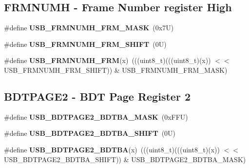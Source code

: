 \subsection*{F\+R\+M\+N\+U\+MH -\/ Frame Number register High}
\begin{DoxyCompactItemize}
\item 
\mbox{\label{group___u_s_b___register___masks_ga436241a677d27ecae3001b228b51f536}} 
\#define {\bfseries U\+S\+B\+\_\+\+F\+R\+M\+N\+U\+M\+H\+\_\+\+F\+R\+M\+\_\+\+M\+A\+SK}~(0x7\+U)
\item 
\mbox{\label{group___u_s_b___register___masks_gacb18c63687d37e245a79d7e7551823a3}} 
\#define {\bfseries U\+S\+B\+\_\+\+F\+R\+M\+N\+U\+M\+H\+\_\+\+F\+R\+M\+\_\+\+S\+H\+I\+FT}~(0\+U)
\item 
\mbox{\label{group___u_s_b___register___masks_gafe9face0ec6a617199ad76945c034da8}} 
\#define {\bfseries U\+S\+B\+\_\+\+F\+R\+M\+N\+U\+M\+H\+\_\+\+F\+RM}(x)~(((uint8\+\_\+t)(((uint8\+\_\+t)(x)) $<$$<$ U\+S\+B\+\_\+\+F\+R\+M\+N\+U\+M\+H\+\_\+\+F\+R\+M\+\_\+\+S\+H\+I\+FT)) \& U\+S\+B\+\_\+\+F\+R\+M\+N\+U\+M\+H\+\_\+\+F\+R\+M\+\_\+\+M\+A\+SK)
\end{DoxyCompactItemize}
\subsection*{B\+D\+T\+P\+A\+G\+E2 -\/ B\+DT Page Register 2}
\begin{DoxyCompactItemize}
\item 
\mbox{\label{group___u_s_b___register___masks_ga69407c90a73a26bc60f3f9b75e4bd7c0}} 
\#define {\bfseries U\+S\+B\+\_\+\+B\+D\+T\+P\+A\+G\+E2\+\_\+\+B\+D\+T\+B\+A\+\_\+\+M\+A\+SK}~(0x\+F\+F\+U)
\item 
\mbox{\label{group___u_s_b___register___masks_gae67d0252b1559f854264f0fe52ff6fb5}} 
\#define {\bfseries U\+S\+B\+\_\+\+B\+D\+T\+P\+A\+G\+E2\+\_\+\+B\+D\+T\+B\+A\+\_\+\+S\+H\+I\+FT}~(0\+U)
\item 
\mbox{\label{group___u_s_b___register___masks_ga1b7b12b3e6686e4b15b1cfa072a805eb}} 
\#define {\bfseries U\+S\+B\+\_\+\+B\+D\+T\+P\+A\+G\+E2\+\_\+\+B\+D\+T\+BA}(x)~(((uint8\+\_\+t)(((uint8\+\_\+t)(x)) $<$$<$ U\+S\+B\+\_\+\+B\+D\+T\+P\+A\+G\+E2\+\_\+\+B\+D\+T\+B\+A\+\_\+\+S\+H\+I\+FT)) \& U\+S\+B\+\_\+\+B\+D\+T\+P\+A\+G\+E2\+\_\+\+B\+D\+T\+B\+A\+\_\+\+M\+A\+SK)
\end{DoxyCompactItemize}

